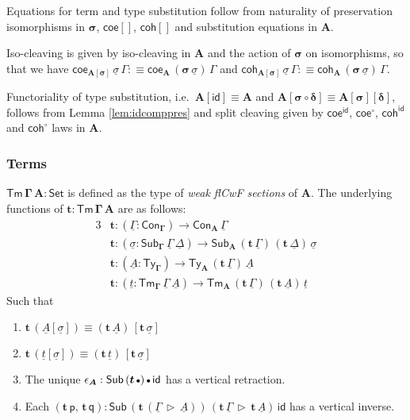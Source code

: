 \documentclass[12pt,a4paper,twoside,openany]{book}
\theoremstyle{remark}
\theoremstyle{definition}
\theoremstyle{theorem}
\newcommand{\bs}[1]{\boldsymbol{#1}}
\newcommand{\id}{\mathsf{id}}
\newcommand{\Con}{\mathsf{Con}}
\newcommand{\Sub}{\mathsf{Sub}}
\newcommand{\Tm}{\mathsf{Tm}}
\newcommand{\Ty}{\mathsf{Ty}}
\newcommand{\ra}{\rightarrow}
\newcommand{\Set}{\mathsf{Set}}
\newcommand{\ext}{\triangleright}
\newcommand{\emptycon}{\scaleobj{.75}\bullet}
\newcommand{\appK}{\mathsf{app}_{\K}}
\newcommand{\p}{\mathsf{p}}
\newcommand{\q}{\mathsf{q}}
\newcommand{\K}{\mathsf{K}}
\newcommand{\bTm}{\bs{\Tm}}
\newcommand{\bGamma}{\bs{\Gamma}}
\newcommand{\bsigma}{\bs{\sigma}}
\newcommand{\bt}{\bs{t}}
\newcommand{\bA}{\bs{A}}
\newcommand{\ul}[1]{\underline{#1}}
\newcommand{\ulGamma}{\ul{\Gamma}}
\newcommand{\ulDelta}{\ul{\Delta}}
\newcommand{\ulsigma}{\ul{\sigma}}
\newcommand{\ult}{\ul{t}}
\newcommand{\ulA}{\ul{A}}
\newcommand{\coe}{\mathsf{coe}}
\newcommand{\coh}{\mathsf{coh}}
\newcommand{\defn}{:\equiv}
\begin{document}
Equations for term and type substitution follow from naturality of preservation
isomorphisms in $\bsigma$, $\coe[]$, $\coh[]$ and substitution equations in
$\bA$.


Iso-cleaving is given by iso-cleaving in $\bA$ and the action of $\bsigma$ on
isomorphisms, so that we have $\coe_{\bs{A[\sigma]}}\,\ulsigma\,\Gamma
\defn \coe_{\bA}\,(\bsigma\,\ulsigma)\,\Gamma$ and $\coh_{\bs{A[\sigma]}}\,\ulsigma\,\Gamma
\defn \coh_{\bA}\,(\bsigma\,\ulsigma)\,\Gamma$.

Functoriality of type substitution, i.e.\ $\bs{A[\id]} \equiv \bA$ and
$\bs{A[\sigma\circ\delta]} \equiv \bs{A[\sigma][\delta]}$, follows
from Lemma \ref{lem:idcomppres} and split cleaving given by $\coe^{\id}$,
$\coe^{\circ}$, $\coh^{\id}$ and $\coh^{\circ}$ laws in $\bA$.

\subsubsection{Terms}

$\bs{\Tm\,\Gamma\,A} : \Set$ is defined as the type of
\emph{weak flCwF sections} of $\bA$. The underlying functions of $\bt :
\bTm\,\bGamma\,\bA$ are as follows:
\begin{alignat*}{3}
  & \bt : (\ulGamma : \Con_{\bGamma}) \ra \Con_{\bA}\,\ulGamma\\
  & \bt : (\ulsigma : \Sub_{\bGamma}\,\ulGamma\,\ulDelta)
         \ra \Sub_{\bA}\,(\bt\,\ulGamma)\,(\bt\,\ulDelta)\,\ulsigma\\
  & \bt : (\ulA : \Ty_{\bGamma}) \ra \Ty_{\bA}\,(\bt\,\ulGamma)\,\ulA\\
  & \bt : (\ult : \Tm_{\bGamma}\,\ulGamma\,\ulA) \ra
          \Tm_{\bA}\,(\bt\,\ulGamma)\,(\bt\,\ulA)\,\ult
\end{alignat*}
Such that
\begin{enumerate}
  \item $\bt\,(\ulA[\ulsigma]) \equiv (\bt\,\ulA)\,[\bt\,\ulsigma]$
  \item $\bt\,(\ult[\ulsigma]) \equiv (\bt\,\ult)\,[\bt\,\ulsigma]$
  \item The unique $\epsilon_{\bA} : \Sub\,(\bt\,\emptycon)\,\emptycon\,\id$ has a vertical retraction.
  \item Each $(\bt\,\p,\,\bt\,\q) : \Sub\,(\bt\,(\ulGamma\,\ext\,\ulA))\,(\bt\,\ulGamma\,\ext\,\bt\,\ulA)\,\id$ has a vertical inverse.
\end{enumerate}
\end{document}
